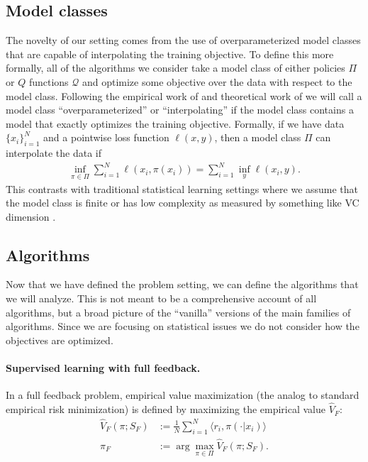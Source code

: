 \subsection{Model classes}

The novelty of our setting comes from the use of overparameterized model classes that are capable of interpolating the training objective.
To define this more formally, all of the algorithms we consider take a model class of either policies $ \Pi$ or $ Q$ functions $ \mathcal{Q}$ and optimize some objective over the data with respect to the model class.
Following the empirical work of \cite{zhang2016understanding} and theoretical work of \cite{belkin2018overfitting} we will call a model class ``overparameterized'' or ``interpolating'' if the model class contains a model that exactly optimizes the training objective. Formally, if we have data $ \{x_i\}_{i=1}^N$ and a pointwise loss function $ \ell(x, y)$, then a model class $ \Pi$ can interpolate the data if
\begin{align*}
    \inf_{\pi\in \Pi} \sum_{i=1}^N \ell(x_i, \pi(x_i)) = \sum_{i=1}^N \inf_{y} \ell(x_i, y).
\end{align*}
This contrasts with traditional statistical learning settings where we assume that the model class is finite or has low complexity as measured by something like VC dimension \cite{strehl2010learning, swaminathan2015counterfactual}.


\subsection{Algorithms}\label{sec:basic-algs}

Now that we have defined the problem setting, we can define the algorithms that we will analyze. This is not meant to be a comprehensive account of all algorithms, but a broad picture of the ``vanilla'' versions of the main families of algorithms. Since we are focusing on statistical issues we do not consider how the objectives are optimized.

\paragraph{Supervised learning with full feedback.} In a full feedback problem, empirical value maximization (the analog to standard empirical risk minimization) is defined by maximizing the empirical value $ \hat V_F$:
\begin{align}
    \hat V_F(\pi; S_F) &:= \frac{1}{N}\sum_{i=1}^N \langle r_i, \pi(\cdot|x_i)\rangle\\  \pi_F &:= \arg\max_{\pi\in \Pi} \hat V_F(\pi;S_F).
\end{align}


